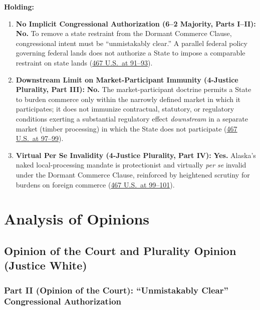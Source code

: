 \documentclass[12pt]{article}
\begin{document}
\textbf{Holding:}

\begin{enumerate}
    \item \textbf{No Implicit Congressional Authorization (6--2 Majority, Parts I--II):} \textbf{No.} To remove a state restraint from the Dormant Commerce Clause, congressional intent must be ``unmistakably clear.'' A parallel federal policy governing federal lands does not authorize a State to impose a comparable restraint on state lands (\href{https://supreme.justia.com/cases/federal/us/467/82/}{467 U.S.\ at 91--93}).
    \item \textbf{Downstream Limit on Market-Participant Immunity (4-Justice Plurality, Part III):} \textbf{No.} The market-participant doctrine permits a State to burden commerce only within the narrowly defined market in which it participates; it does not immunize contractual, statutory, or regulatory conditions exerting a substantial regulatory effect \emph{downstream} in a separate market (timber processing) in which the State does not participate (\href{https://supreme.justia.com/cases/federal/us/467/82/}{467 U.S.\ at 97--99}).
    \item \textbf{Virtual Per Se Invalidity (4-Justice Plurality, Part IV):} \textbf{Yes.} Alaska's naked local-processing mandate is protectionist and virtually \textit{per se} invalid under the Dormant Commerce Clause, reinforced by heightened scrutiny for burdens on foreign commerce (\href{https://supreme.justia.com/cases/federal/us/467/82/}{467 U.S.\ at 99--101}).
\end{enumerate}

\section{Analysis of Opinions}
\subsection{Opinion of the Court and Plurality Opinion (Justice White)}

\subsubsection{Part II (Opinion of the Court): ``Unmistakably Clear'' Congressional Authorization}
\end{document}
